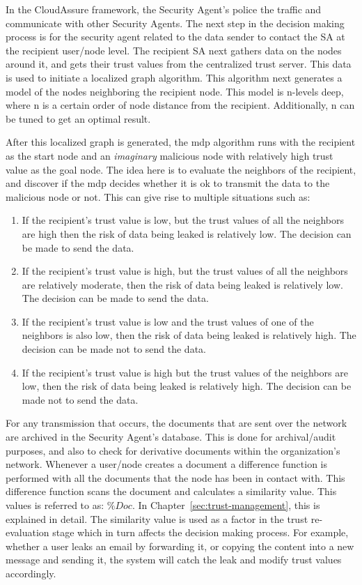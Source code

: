 In the CloudAssure framework, the Security Agent's police the traffic and communicate with other Security Agents. 
The next step in the decision making process is for the security agent related to the data sender
to contact the SA at the recipient user/node level. The recipient SA next
gathers data on the nodes around it, and gets their trust values from the
centralized trust server. This data is used to initiate a localized graph
algorithm. This algorithm next generates a model of the nodes neighboring the
recipient node. This model is n-levels deep, where n is a certain order of node
distance from the recipient. Additionally, n can be tuned to get an optimal result.

After this localized graph is generated, the \gls{mdp} algorithm runs with
the recipient as the start node and an \emph{imaginary} malicious node with
relatively high trust value as the goal node. The idea here is to evaluate
the neighbors of the recipient, and discover if the \gls{mdp} decides whether it is ok to
transmit the data to the malicious node or not. This can give rise to
multiple situations such as:
\begin{enumerate}
    \item If the recipient's trust value is low, but the trust values of all the
        neighbors are high then the risk of data being leaked is relatively low. The
        decision can be made to send the data.
    \item If the recipient's trust value is high, but the trust values of all the
        neighbors are relatively moderate, then the risk of data being leaked is
        relatively low. The decision can be made to send the data.
    \item If the recipient's trust value is low and the trust values of one of the
        neighbors is also low, then the risk of data being leaked is relatively
        high. The decision can be made not to send the data.
    \item If the recipient's trust value is high but the trust values of the neighbors
are low, then the risk of data being leaked is relatively high. The decision
can be made not to send the data.  
\end{enumerate}
For any transmission that occurs, the
documents that are sent over the network are archived in the Security Agent's 
database. This is done for archival/audit purposes, and also to check for
derivative documents within the organization's network. Whenever a user/node creates
a document a difference function is performed with all the documents that the node
has been in contact with. This difference function scans the document and
calculates a similarity value. This values is referred to as: \(\%Doc\). In
Chapter~\ref{sec:trust-management}, this is explained in detail. The similarity value is used as a factor in
the trust re-evaluation stage which in turn affects the decision making
process. For example, whether a user leaks an email by forwarding it, or
copying the content into a new message and sending it, the system will catch
the leak and modify trust values accordingly.
